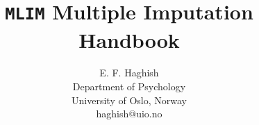 \documentclass{ol-softwaremanual}
\title{\vspace{30} \texttt{MLIM} Multiple Imputation Handbook}
\author{E. F. Haghish\\ \small{Department of Psychology\\University of Oslo, Norway \\ haghish@uio.no}\linebreak}
\begin{document}
\maketitle

\tableofcontents
\listoflistings
\newpage













%


%
\end{document}
